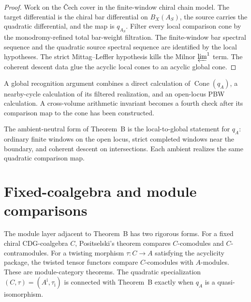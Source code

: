\begin{proof}
Work on the \v Cech cover in the finite-window chiral chain model.
The target differential is the chiral bar differential on
\(B_X(A_S)\), the source carries the quadratic differential, and the
map is \(q_{A_S}\).  Filter every local comparison cone by the
monodromy-refined total bar-weight filtration.  The finite-window bar
spectral sequence and the quadratic source spectral sequence are
identified by the local hypotheses.  The strict Mittag--Leffler
hypothesis kills the Milnor \(\varprojlim^1\) term.  The coherent
descent data glue the acyclic local cones to an acyclic global cone.
\end{proof}

\begin{remark}
\label{rem:tbsp-global-inversion-independent-checks}
A global recognition argument combines a direct calculation of
\(\operatorname{Cone}(q_A)\), a nearby-cycle calculation of its
filtered realization, and an open-locus PBW calculation.  A
cross-volume arithmetic invariant becomes a fourth check after its
comparison map to the cone has been constructed.
\end{remark}

\begin{remark}
\label{rem:tbsp-ambient-neutral-form}
The ambient-neutral form of Theorem~B is the local-to-global statement
for \(q_A\): ordinary finite windows on the open locus, strict
completed windows near the boundary, and coherent descent on
intersections.  Each ambient realizes the same quadratic comparison
map.
\end{remark}

\section{Fixed-coalgebra and module comparisons}
\label{sec:tbsp-module-level-proof-valpha1}

The module layer adjacent to Theorem~B has two rigorous forms.  For a
fixed chiral CDG-coalgebra \(C\), Positselski's theorem compares
\(C\)-comodules and \(C\)-contramodules.  For a twisting morphism
\(\tau\colon C\to A\) satisfying the acyclicity package, the twisted
tensor functors compare \(C\)-comodules with \(A\)-modules.  These are
module-category theorems.  The quadratic specialization
\((C,\tau)=(A^{\mathrm i},\tau_{\mathrm i})\) is connected with
Theorem~B exactly when \(q_A\) is a quasi-isomorphism.

